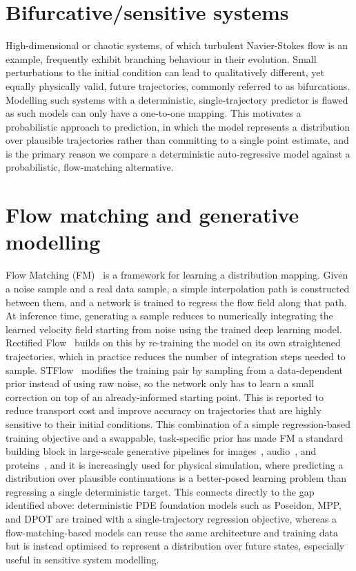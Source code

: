 \section{Bifurcative/sensitive systems} 

High-dimensional or chaotic systems, of which turbulent Navier-Stokes flow is an example, frequently exhibit branching behaviour in their evolution. Small perturbations to the initial condition can lead to qualitatively different, yet equally physically valid, future trajectories, commonly referred to as bifurcations. Modelling such systems with a deterministic, single-trajectory predictor is flawed as such models can only have a one-to-one mapping. This motivates a probabilistic approach to prediction, in which the model represents a distribution over plausible trajectories rather than committing to a single point estimate, and is the primary reason we compare a deterministic auto-regressive model against a probabilistic, flow-matching alternative.

\section{Flow matching and generative modelling} 

Flow Matching (FM)~\cite{lipman2022flowmatching} \cite{lipman2024flowmatchingguide} is a framework for learning a distribution mapping. Given a noise sample and a real data sample, a simple interpolation path is constructed between them, and a network is trained to regress the flow field along that path. At inference time, generating a sample reduces to numerically integrating the learned velocity field starting from noise using the trained deep learning model. Rectified Flow~\cite{liu2022rectifiedflow} builds on this by re-training the model on its own straightened trajectories, which in practice reduces the number of integration steps needed to sample. STFlow~\cite{tenbrinke2025stflow} modifies the training pair by sampling from a data-dependent prior instead of using raw noise, so the network only has to learn a small correction on top of an already-informed starting point. This is reported to reduce transport cost and improve accuracy on trajectories that are highly sensitive to their initial conditions. This combination of a simple regression-based training objective and a swappable, task-specific prior has made FM a standard building block in large-scale generative pipelines for images~\cite{esser2024sd3}, audio~\cite{vyas2023audiobox}, and proteins~\cite{huguet2024proteinfm}, and it is increasingly used for physical simulation, where predicting a distribution over plausible continuations is a better-posed learning problem than regressing a single deterministic target. This connects directly to the gap identified above: deterministic PDE foundation models such as Poseidon, MPP, and DPOT are trained with a single-trajectory regression objective, whereas a flow-matching-based models can reuse the same architecture and training data but is instead optimised to represent a distribution over future states, especially useful in sensitive system modelling. 
